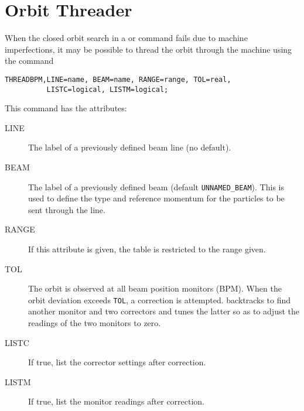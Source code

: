 \section{Orbit Threader}
\label{sec:thread}
When the closed orbit search in a  or
 command fails due to machine imperfections, 
it may be possible to thread the orbit through the machine using the command 
\begin{verbatim}
THREADBPM,LINE=name, BEAM=name, RANGE=range, TOL=real,
          LISTC=logical, LISTM=logical;
\end{verbatim}
This command has the attributes:
\begin{description}
\item[LINE]
  The label of a previously defined beam line (no default).
\item[BEAM]
  The label of a previously defined beam (default \texttt{UNNAMED\_BEAM}).
  This is used to define the type and reference momentum for the
  particles to be sent through the line.
\item[RANGE]
  If this attribute is given, the table is restricted to the range given.
\item[TOL]
  The orbit is observed at all beam position monitors (BPM).
  When the orbit deviation exceeds \texttt{TOL},
  a correction is attempted.
  \opal backtracks to find another monitor and two correctors and tunes the
  latter so as to adjust the readings of the two monitors to zero.
\item[LISTC]
  If true, list the corrector settings after correction.
\item[LISTM]
  If true, list the monitor readings after correction.
\end{description}

